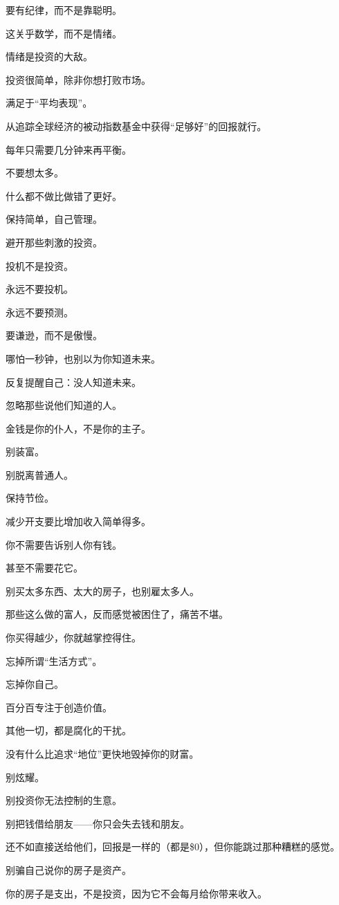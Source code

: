 \documentclass[
]{article}
\begin{document}
要有纪律，而不是靠聪明。

这关乎数学，而不是情绪。

情绪是投资的大敌。

投资很简单，除非你想打败市场。

满足于``平均表现''。

从追踪全球经济的被动指数基金中获得``足够好''的回报就行。

每年只需要几分钟来再平衡。

不要想太多。

什么都不做比做错了更好。

保持简单，自己管理。

避开那些刺激的投资。

投机不是投资。

永远不要投机。

永远不要预测。

要谦逊，而不是傲慢。

哪怕一秒钟，也别以为你知道未来。

反复提醒自己：没人知道未来。

忽略那些说他们知道的人。

金钱是你的仆人，不是你的主子。

别装富。

别脱离普通人。

保持节俭。

减少开支要比增加收入简单得多。

你不需要告诉别人你有钱。

甚至不需要花它。

别买太多东西、太大的房子，也别雇太多人。

那些这么做的富人，反而感觉被困住了，痛苦不堪。

你买得越少，你就越掌控得住。

忘掉所谓``生活方式''。

忘掉你自己。

百分百专注于创造价值。

其他一切，都是腐化的干扰。

没有什么比追求``地位''更快地毁掉你的财富。

别炫耀。

别投资你无法控制的生意。

别把钱借给朋友------你只会失去钱和朋友。

还不如直接送给他们，回报是一样的（都是\$0），但你能跳过那种糟糕的感觉。

别骗自己说你的房子是资产。

你的房子是支出，不是投资，因为它不会每月给你带来收入。
\end{document}
